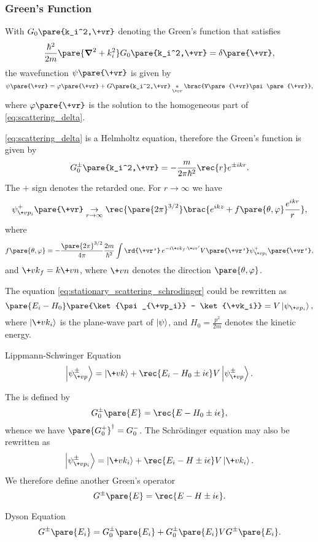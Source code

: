 \documentclass[hidelinks]{article}
\begin{document}

\subsubsection{Green's Function} %
\label{ssub:green_s_function}

With $G_0\pare{k_i^2,\+vr}$ denoting the Green's function that satisfies
\begin{equation}
    \label{eq:scattering_delta}
    \frac{\hbar^2}{2m}\pare{\grad^2 + k_i^2}G_0\pare{k_i^2,\+vr} = \delta\pare{\+vr},
\end{equation}
the wavefunction $\psi\pare{\+vr}$ is given by
\[ \psi\pare{\+vr} = \varphi\pare{\+vr} + G\pare{k_i^2,\+vr}\underset{\+vr}{*} \brac{V\pare{\+vr}\psi\pare{\+vr}}, \]
where $\varphi\pare{\+vr}$ is the solution to the homogeneous part of \eqref{eq:scattering_delta}.
\par
\eqref{eq:scattering_delta} is a Helmholtz equation, therefore the Green's function is given by
\[ G^{\pm}_{0}\pare{k_i^2,\+vr} = -\frac{m}{2\pi\hbar^2}\rec{r}e^{\pm ikr}. \]
The $+$ sign denotes the retarded one. For $r\rightarrow \infty$ we have
\[ \psi^+_{\+vp_i}\pare{\+vr} \underset{r\rightarrow \infty}{\rightarrow }\rec{\pare{2\pi}^{3/2}}\brac{e^{ikz} + f\pare{\theta,\varphi} \frac{e^{ikr}}{r}}, \]
where
\begin{equation}
    \label{eq:f_in_green_function}
    f\pare{\theta,\varphi} = -\frac{\pare{2\pi}^{3/2}}{4\pi}\frac{2m}{\hbar^2}\int \rd{\+vr'}\, e^{-i\+vk_f \cdot \+vr'}V\pare{\+vr'}\psi_{\+vp_i}^+\pare{\+vr'},
\end{equation}
and $\+vk_f = k\+vn$, where $\+vn$ denotes the direction $\pare{\theta,\varphi}$.


\label{ssub:lippmann_schwinger_equation}

The equation \eqref{eq:stationary_scattering_schrodinger} could be rewritten as
\[ \pare{E_i - H_0}\pare{\ket{\psi_{\+vp_i}} - \ket{\+vk_i}} = V\ket{\psi_{\+vp_i}}, \]
where $\ket{\+vk_i}$ is the plane-wave part of $\ket{\psi}$, and $\displaystyle H_0 = \frac{p^2}{2m}$ denotes the kinetic energy.
\begin{finaleq}{Lippmann-Schwinger Equation}
    \[ \ket{\psi^{\pm}_{\+vp}} = \ket{\+vk} + \rec{E_i - H_0 \pm i\epsilon} V\ket{\psi^\pm_{\+vp}}. \]
\end{finaleq}
The  is defined by
\[ G_0^\pm\pare{E} = \rec{E - H_0 \pm i\epsilon}, \]
whence we have $\pare{G_0^+}^\dagger = G_0^-$. The Schr\"odinger equation may also be rewritten as
\[ \ket{\psi_{\+vp_i}^\pm} = \ket{\+vk_i} + \rec{E_i - H \pm i\epsilon}V\ket{\+vk_i}. \]
We therefore define another Green's operator
\[ G^\pm\pare{E} = \rec{E - H \pm i\epsilon}. \]
\vspace{-\baselineskip}
\begin{finaleq}{Dyson Equation}
    \[ G^\pm\pare{E_i} = G^\pm_0\pare{E_i} + G^\pm_0\pare{E_i}VG^\pm\pare{E_i}. \]
\end{finaleq}
\end{document}
